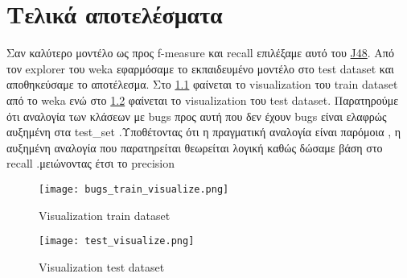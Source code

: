 \chapter{Τελικά αποτελέσματα}

Σαν καλύτερο μοντέλο ως προς f-measure και recall επιλέξαμε αυτό του \hyperref[sssec:j48]{J48}.
Από τον explorer του weka εφαρμόσαμε το εκπαιδευμένο μοντέλο στο test dataset και αποθηκεύσαμε το αποτέλεσμα.
Στο \hyperref[fig:train-set-visualize]{\figurename{} \ref{fig:train-set-visualize}}
φαίνεται το visualization του train dataset από το weka 
ενώ στο \hyperref[fig:test-set-visualize]{\figurename{} \ref{fig:test-set-visualize}}
φαίνεται το visualization του test dataset.
Παρατηρούμε ότι αναλογία των κλάσεων με bugs προς αυτή που δεν έχουν bugs είναι ελαφρώς αυξημένη στα 
test_set .Υποθέτοντας ότι η πραγματική αναλογία είναι παρόμοια , η αυξημένη αναλογία που παρατηρείται θεωρείται λογική καθώς δώσαμε βάση στο recall .μειώνοντας έτσι το precision

\begin{figure}[htb]
\centering
\texttt{[image: bugs\_train\_visualize.png]}
\caption{Visualization train dataset}
\label{fig:train-set-visualize}
\end{figure}
\begin{figure}[htb]
\centering
\texttt{[image: test\_visualize.png]}
\caption{Visualization test dataset}
\label{fig:test-set-visualize}
\end{figure}